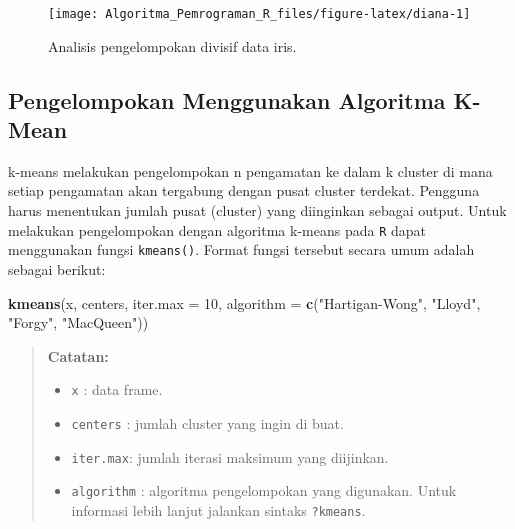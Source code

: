 \documentclass[
]{book}
\newenvironment{Shaded}{\begin{snugshade}}{\end{snugshade}}
\newcommand{\AttributeTok}[1]{\textcolor[rgb]{0.13,0.29,0.53}{#1}}
\newcommand{\DecValTok}[1]{\textcolor[rgb]{0.00,0.00,0.81}{#1}}
\newcommand{\FunctionTok}[1]{\textcolor[rgb]{0.13,0.29,0.53}{\textbf{#1}}}
\newcommand{\NormalTok}[1]{#1}
\newcommand{\StringTok}[1]{\textcolor[rgb]{0.31,0.60,0.02}{#1}}
\providecommand{\tightlist}{%
  \setlength{\itemsep}{0pt}\setlength{\parskip}{0pt}}
\theoremstyle{definition}
\theoremstyle{definition}
\theoremstyle{definition}
\theoremstyle{definition}
\theoremstyle{remark}
\begin{document}
\begin{figure}

{\centering \texttt{[image: Algoritma\_Pemrograman\_R\_files/figure-latex/diana-1]} 

}

\caption{Analisis pengelompokan divisif data iris.}\label{fig:diana}
\end{figure}

\hypertarget{pengelompokan-menggunakan-algoritma-k-mean}{%
\subsection{Pengelompokan Menggunakan Algoritma K-Mean}\label{pengelompokan-menggunakan-algoritma-k-mean}}

k-means melakukan pengelompokan n pengamatan ke dalam k cluster di mana setiap pengamatan akan tergabung dengan pusat cluster terdekat. Pengguna harus menentukan jumlah pusat (cluster) yang diinginkan sebagai output. Untuk melakukan pengelompokan dengan algoritma k-means pada \texttt{R} dapat menggunakan fungsi \texttt{kmeans()}. Format fungsi tersebut secara umum adalah sebagai berikut:

\begin{Shaded}
\begin{Highlighting}[]
\FunctionTok{kmeans}\NormalTok{(x, centers, }\AttributeTok{iter.max =} \DecValTok{10}\NormalTok{,}
       \AttributeTok{algorithm =} \FunctionTok{c}\NormalTok{(}\StringTok{"Hartigan{-}Wong"}\NormalTok{, }\StringTok{"Lloyd"}\NormalTok{, }\StringTok{"Forgy"}\NormalTok{,}
                     \StringTok{"MacQueen"}\NormalTok{))}
\end{Highlighting}
\end{Shaded}

\begin{quote}
\textbf{Catatan:}

\begin{itemize}
\tightlist
\item
  \texttt{x} : data frame.
\item
  \texttt{centers} : jumlah cluster yang ingin di buat.
\item
  \texttt{iter.max}: jumlah iterasi maksimum yang diijinkan.
\item
  \texttt{algorithm} : algoritma pengelompokan yang digunakan. Untuk informasi lebih lanjut jalankan sintaks \texttt{?kmeans}.
\end{itemize}
\end{quote}
\end{document}
